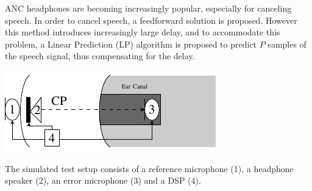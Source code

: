 \large




 ANC headphones are becoming increasingly popular, especially for canceling speech. 
 In order to cancel speech, a feedforward solution is proposed.
 However this method introduces increasingly large delay, and to accommodate this problem, a Linear Prediction (LP) algorithm is proposed to predict $P$ samples
 of the speech signal, thus compensating for the delay.
\begin{centering}
	\includegraphics[width=\textwidth]{figures/BasicOverviewZoomed.pdf}
\end{centering}
The simulated test setup consists of a reference microphone (1), a headphone speaker (2), an error microphone (3) and a DSP (4). 